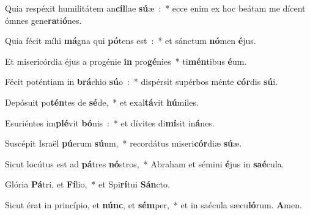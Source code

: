 ﻿\item Quia respéxit humilitátem an\textbf{cíl}lae \textbf{sú}æ~:~* ecce enim ex hoc beátam me dícent ómnes gene\textbf{ra}ti\textbf{ó}nes.
\item Quia fécit míhi \textbf{má}gna qui \textbf{pó}tens est~:~* et sánctum \textbf{nó}men \textbf{é}jus.
\item Et misericórdia éjus a progénie \textbf{in} pro\textbf{gé}nies~* ti\textbf{mén}tibus \textbf{é}um.
\item Fécit poténtiam in \textbf{brá}chio \textbf{sú}o~:~* dispérsit supérbos ménte \textbf{cór}dis \textbf{sú}i.
\item Depósuit po\textbf{tén}tes de \textbf{sé}de,~* et exal\textbf{tá}vit \textbf{hú}miles.
\item Esuriéntes im\textbf{plé}vit \textbf{bó}nis~:~* et dívites di\textbf{mí}sit in\textbf{á}nes.
\item Suscépit Israël \textbf{pú}erum \textbf{sú}um,~* recordátus miseri\textbf{cór}diæ \textbf{sú}æ.
\item Sicut locútus est ad \textbf{pá}tres \textbf{nó}stros,~* Abraham et sémini \textbf{é}jus in \textbf{saé}cula.
\item Glória \textbf{Pá}tri, et \textbf{Fí}lio,~* et Spi\textbf{rí}tui \textbf{Sán}cto.
\item Sicut érat in princípio, et \textbf{núnc}, et \textbf{sém}per,~* et in saécula sæcu\textbf{ló}rum. \textbf{A}men.
